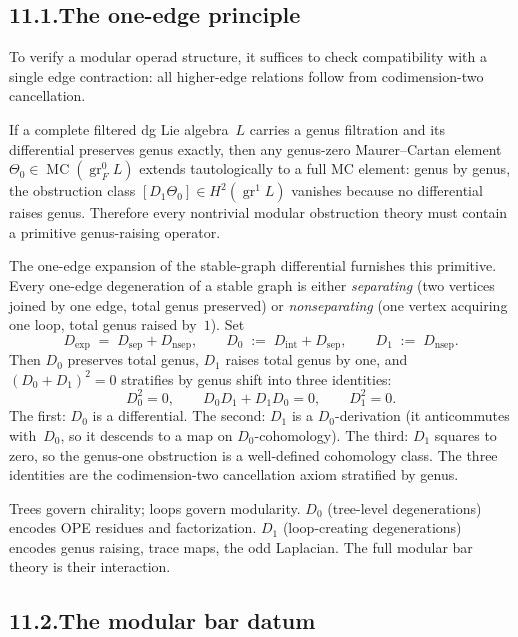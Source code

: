 \documentclass[11pt]{report}
\theoremstyle{definition}
\theoremstyle{remark}
\numberwithin{equation}{section}
\begin{document}
\subsection*{11.1.\enspace The one-edge principle}

To verify a modular operad structure, it suffices to check
compatibility with a single edge contraction: all higher-edge
relations follow from codimension-two cancellation.

If a complete filtered dg Lie algebra~$L$ carries a genus filtration
and its differential preserves genus exactly, then any genus-zero
Maurer--Cartan element
$\Theta_0\in\operatorname{MC}(\operatorname{gr}_F^0 L)$ extends
tautologically to a full MC element: genus by genus, the obstruction
class $[D_1\Theta_0]\in H^2(\operatorname{gr}^1 L)$ vanishes
because no differential raises genus. Therefore every nontrivial
modular obstruction theory must contain a primitive genus-raising
operator.

The one-edge expansion of the stable-graph differential furnishes
this primitive. Every one-edge degeneration of a stable graph is
either \emph{separating} (two vertices joined by one edge, total
genus preserved) or \emph{nonseparating} (one vertex acquiring one
loop, total genus raised by~$1$). Set
\[
D_{\mathrm{exp}}\;=\;D_{\mathrm{sep}}+D_{\mathrm{nsep}},
\qquad
D_0\;:=\;D_{\mathrm{int}}+D_{\mathrm{sep}},
\qquad
D_1\;:=\;D_{\mathrm{nsep}}.
\]
Then $D_0$ preserves total genus, $D_1$ raises total genus by one,
and $(D_0+D_1)^2=0$ stratifies by genus shift into three identities:
\[
D_0^2=0,
\qquad
D_0 D_1+D_1 D_0=0,
\qquad
D_1^2=0.
\]
The first: $D_0$ is a differential. The second: $D_1$ is a
$D_0$-derivation (it anticommutes with~$D_0$, so it descends to a
map on $D_0$-cohomology). The third: $D_1$ squares to zero, so
the genus-one obstruction is a well-defined cohomology class.
The three identities are the codimension-two cancellation axiom
stratified by genus.

Trees govern chirality; loops govern
modularity. $D_0$ (tree-level
degenerations) encodes OPE residues and
factorization. $D_1$ (loop-creating
degenerations) encodes genus raising, trace
maps, the odd Laplacian. The full modular bar theory is their
interaction.

\subsection*{11.2.\enspace The modular bar datum}
\end{document}
